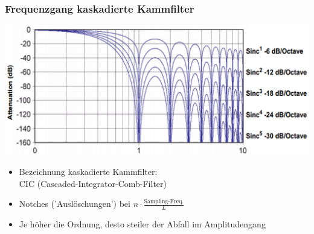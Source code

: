 \subsubsection*{Frequenzgang kaskadierte Kammfilter}

\begin{minipage}[c]{0.4\columnwidth}
    \includegraphics[width=\columnwidth]{images/frequenzgang_kaskadierte_kammfilter.png}
\end{minipage}
\hfill
\begin{minipage}[c]{0.58\columnwidth}
    \begin{itemize}
        \item Bezeichnung kaskadierte Kammfilter: \\
            CIC (Cascaded-Integrator-Comb-Filter)
        \item Notches ('Auslöschungen') bei $n \cdot \frac{\text{Sampling-Freq.}}{L}$
        \item Je höher die Ordnung, desto steiler der Abfall im Amplitudengang
    \end{itemize}
\end{minipage}

